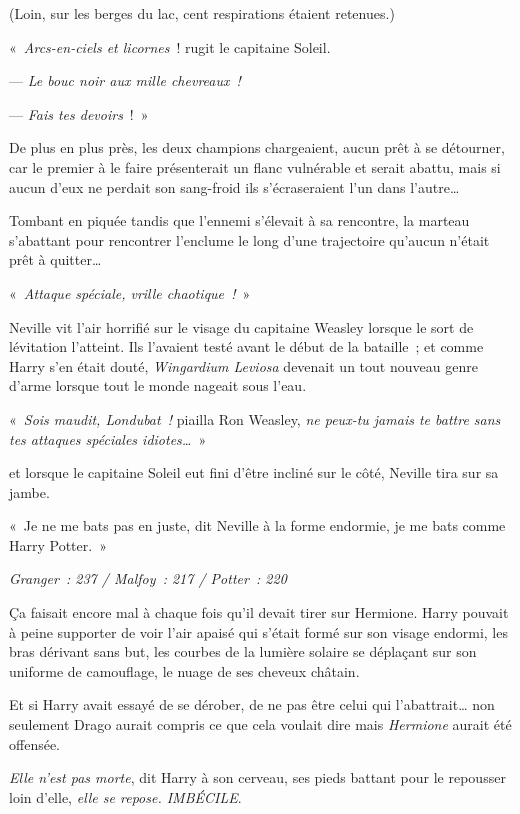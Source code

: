 (Loin, sur les berges du lac, cent respirations étaient retenues.)

«~\emph{Arcs-en-ciels et licornes}~! rugit le capitaine Soleil.

--- \emph{Le bouc noir aux mille chevreaux~!}

--- \emph{Fais tes devoirs}~!~»

De plus en plus près, les deux champions chargeaient, aucun prêt à se détourner, car le premier à le faire présenterait un flanc vulnérable et serait abattu, mais si aucun d'eux ne perdait son sang-froid ils s'écraseraient l'un dans l'autre…

Tombant en piquée tandis que l'ennemi s'élevait à sa rencontre, la marteau s'abattant pour rencontrer l'enclume le long d'une trajectoire qu'aucun n'était prêt à quitter…

«~\emph{Attaque spéciale, vrille chaotique~!}~»

Neville vit l'air horrifié sur le visage du capitaine Weasley lorsque le sort de lévitation l'atteint.
Ils l'avaient testé avant le début de la bataille~; et comme Harry s'en était douté, \emph{Wingardium Leviosa} devenait un tout nouveau genre d'arme lorsque tout le monde nageait sous l'eau.

«~\emph{Sois maudit, Londubat~!} piailla Ron Weasley, \emph{ne peux-tu jamais te battre sans tes attaques spéciales idiotes…}~»

et lorsque le capitaine Soleil eut fini d'être incliné sur le côté, Neville tira sur sa jambe.

«~Je ne me bats pas en juste, dit Neville à la forme endormie, je me bats comme Harry Potter.~»

\emph{Granger~: 237 / Malfoy~: 217 / Potter~: 220}

\later

Ça faisait encore mal à chaque fois qu'il devait tirer sur Hermione.
Harry pouvait à peine supporter de voir l'air apaisé qui s'était formé sur son visage endormi, les bras dérivant sans but, les courbes de la lumière solaire se déplaçant sur son uniforme de camouflage, le nuage de ses cheveux châtain.

Et si Harry avait essayé de se dérober, de ne pas être celui qui l'abattrait… non seulement Drago aurait compris ce que cela voulait dire mais \emph{Hermione} aurait été offensée.

\emph{Elle n'est pas morte}, dit Harry à son cerveau, ses pieds battant pour le repousser loin d'elle, \emph{elle se repose.
IMBÉCILE}.

